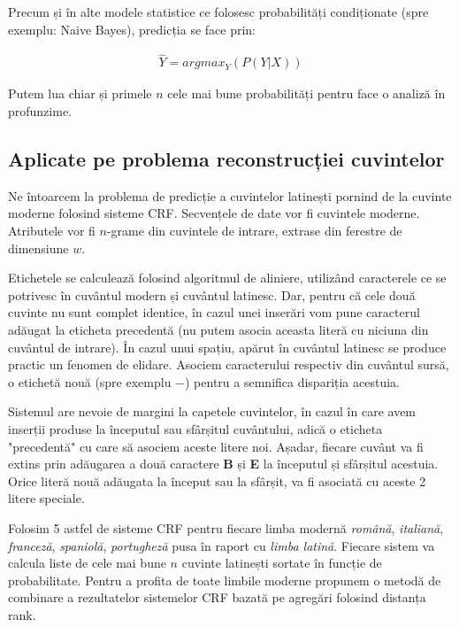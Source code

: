 Precum și în alte modele statistice ce folosesc probabilități condiționate (spre exemplu: Naive Bayes),
predicția se face prin:

\begin{gather*}
  \hat{Y} = argmax_Y(P(Y|X))
\end{gather*}

Putem lua chiar și primele $n$ cele mai bune probabilități pentru face o analiză în profunzime.

\subsection{Aplicate pe problema reconstrucției cuvintelor}
\label{subs:one}
Ne întoarcem la problema de predicție a cuvintelor latinești pornind de la cuvinte moderne folosind 
sisteme CRF. Secvențele de date vor fi cuvintele moderne. Atributele vor fi $n$-grame din cuvintele
de intrare, extrase din ferestre de dimensiune $w$. 

Etichetele se calculează folosind algoritmul de aliniere, utilizând caracterele ce se potrivesc în 
cuvântul modern și cuvântul latinesc. Dar, pentru că cele două cuvinte nu sunt complet identice,
în cazul unei inserări vom pune caracterul adăugat la eticheta precedentă (nu putem asocia aceasta
literă cu niciuna din cuvântul de intrare). În cazul unui spațiu, apărut în cuvântul latinesc se 
produce practic un fenomen de elidare. Asociem caracterului respectiv din cuvântul sursă, o etichetă
nouă (spre exemplu $-$) pentru a semnifica dispariția acestuia.

Sistemul are nevoie de margini la capetele cuvintelor, în cazul în care avem inserții produse la 
începutul sau sfârșitul cuvântului, adică o eticheta "precedentă" cu care să asociem aceste litere noi.
Așadar, fiecare cuvânt va fi extins prin adăugarea a două caractere \textbf{B} și \textbf{E} la 
începutul și sfârșitul acestuia.\cite{theone} Orice literă nouă adăugata la început sau la sfârșit, va
fi asociată cu aceste 2 litere speciale.


Folosim 5 astfel de sisteme CRF pentru fiecare limba modernă \textit{română}, \textit{italiană}, 
\textit{franceză}, \textit{spaniolă}, \textit{portugheză} pusa în raport cu \textit{limba latină}.
Fiecare sistem va calcula liste de cele mai bune $n$ cuvinte latinești sortate în funcție de 
probabilitate. Pentru a profita de toate limbile moderne propunem o metodă de combinare a rezultatelor
sistemelor CRF bazată pe agregări folosind distanța rank.
